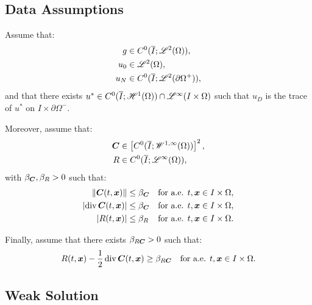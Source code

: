 \subsection{Data Assumptions} \label{assumptions}

Assume that:
\begin{align}
    g & \in C^0(\overline{I}; \mathscr{L}^{2}(\Omega)), \label{equation:ass_1} \\
    u_0 & \in \mathscr{L}^{2}(\Omega), \label{equation:ass_2} \\
    u_N & \in C^0(\overline{I}; \mathscr{L}^{2}(\partial \Omega^+)), \label{equation:ass_3}
\end{align}
and that there exists $u^* \in C^0(\overline{I}; \mathscr{H}^{1}(\Omega)) \cap \mathscr{L}^{\infty}(I \times \Omega)$ such that $u_D$ is the trace of $u^*$ on $I \times \partial \Omega^-$.

Moreover, assume that:
\begin{align}
    \bm{C} & \in \left[ C^0(\overline{I}; \mathscr{W}^{1, \infty}(\Omega)) \right]^2, \label{equation:ass_4} \\
    R & \in C^0(\overline{I}; \mathscr{L}^{\infty}(\Omega)), \label{equation:ass_5}
\end{align}
with $\beta_{\bm{C}}, \beta_{R} > 0$ such that:
\begin{align}
    \lVert \bm{C}(t, \bm{x}) \rVert & \leq \beta_{\bm{C}} &\text{for a.e. } t, \bm{x} \in I \times \Omega, \label{equation:ass_6} \\
    \lvert \operatorname*{div} \bm{C}(t, \bm{x}) \rvert & \leq \beta_{\bm{C}} &\text{for a.e. } t, \bm{x} \in I \times \Omega, \label{equation:ass_7} \\
    \lvert R(t, \bm{x}) \rvert & \leq \beta_{R} &\text{for a.e. } t, \bm{x} \in I \times \Omega. \label{equation:ass_8}
\end{align}

Finally, assume that there exists $\beta_{R \bm{C}} > 0$ such that:
\begin{align}
    R(t, \bm{x}) - \frac{1}{2} \operatorname*{div} \bm{C}(t, \bm{x}) & \geq \beta_{R \bm{C}} &\text{for a.e. } t, \bm{x} \in I \times \Omega. \label{equation:ass_9}
\end{align}

\newpage
\subsection{Weak Solution}

